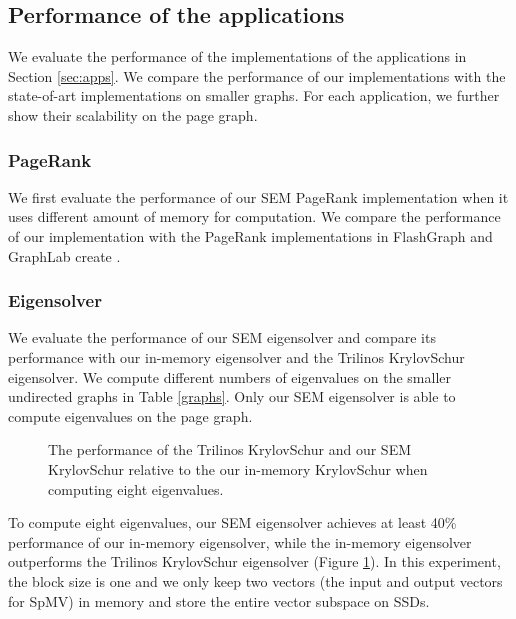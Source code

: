 \subsection{Performance of the applications}

We evaluate the performance of the implementations of the applications in
Section \ref{sec:apps}. We compare the performance of our implementations
with the state-of-art implementations on smaller graphs. For each application,
we further show their scalability on the page graph.

\subsubsection{PageRank}
We first evaluate the performance of our SEM PageRank implementation when
it uses different amount of memory for computation. We compare the performance
of our implementation with the PageRank implementations in FlashGraph
\cite{flashgraph} and GraphLab create \cite{}.

\subsubsection{Eigensolver}

We evaluate the performance of our SEM eigensolver and compare its performance
with our in-memory eigensolver and the Trilinos KrylovSchur eigensolver.
We compute different numbers of eigenvalues on the smaller undirected graphs in
Table \ref{graphs}. Only our SEM eigensolver is able to compute eigenvalues
on the page graph.

\begin{figure}
	\begin{center}
		\footnotesize
		
		\caption{The performance of the Trilinos KrylovSchur and our SEM KrylovSchur
		relative to the our in-memory KrylovSchur when computing eight eigenvalues.}
		\label{fig:eigen}
	\end{center}
\end{figure}

To compute eight eigenvalues, our SEM eigensolver achieves at least 40\%
performance of our in-memory eigensolver, while the in-memory eigensolver
outperforms the Trilinos KrylovSchur eigensolver (Figure \ref{fig:eigen}).
In this experiment, the block size is one and we only keep two vectors
(the input and output vectors for SpMV) in memory and store the entire
vector subspace on SSDs.


